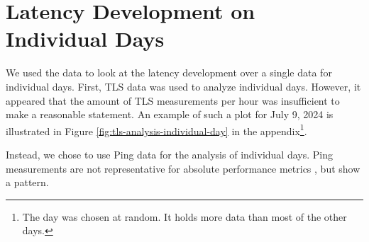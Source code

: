 \section{Latency Development on Individual Days} \label{sec:latency-individual-days}

We used the data to look at the latency development over a single data for
individual days. First, TLS data was used to analyze individual days. However,
it appeared that the amount of TLS measurements per hour was insufficient to
make a reasonable statement. An example of such a plot for July 9, 2024 is
illustrated in Figure \ref{fig:tls-analysis-individual-day} in the
appendix\footnote{The day was chosen at random. It holds more data than most of
	the other days.}.

Instead, we chose to use Ping data for the analysis of individual days. Ping
measurements are not representative for absolute performance metrics
\cite{DBLP:conf/imc/PelsserCVB13}, but show a pattern.


